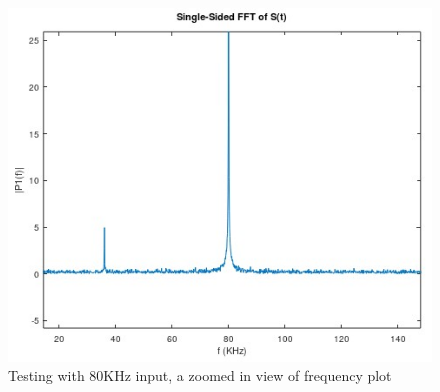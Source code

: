 \begin{figure}[H]
\centering
\includegraphics[width=0.8\columnwidth]{Body/ADC_Voltmeter/images/eee_adcmet_pr01_freq1.jpg}
\caption{Testing with 80KHz input, a zoomed in view of frequency plot}
\label{fig:freq1}
\end{figure}

